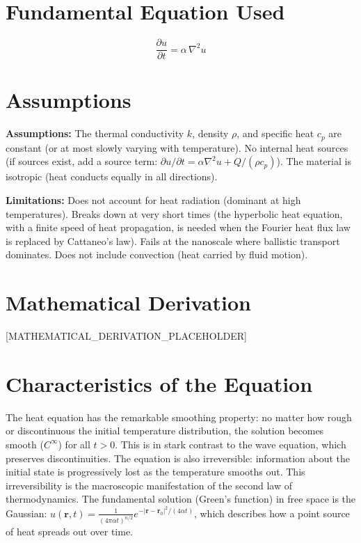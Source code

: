 \documentclass[11pt,openright]{book}
\begin{document}
\section*{Fundamental Equation Used}

\[
\frac{\partial u}{\partial t}=\alpha\,\nabla^2 u
\]
\section*{Assumptions}

\textbf{Assumptions:} The thermal conductivity $k$, density $\rho$, and specific heat $c_p$ are constant (or at most slowly varying with temperature). No internal heat sources (if sources exist, add a source term: $\partial u/\partial t = \alpha\nabla^2 u + Q/(\rho c_p)$). The material is isotropic (heat conducts equally in all directions).


\textbf{Limitations:} Does not account for heat radiation (dominant at high temperatures). Breaks down at very short times (the hyperbolic heat equation, with a finite speed of heat propagation, is needed when the Fourier heat flux law is replaced by Cattaneo's law). Fails at the nanoscale where ballistic transport dominates. Does not include convection (heat carried by fluid motion).


\section*{Mathematical Derivation}

[MATHEMATICAL_DERIVATION_PLACEHOLDER]

\section*{Characteristics of the Equation}

The heat equation has the remarkable smoothing property: no matter how rough or discontinuous the initial temperature distribution, the solution becomes smooth ($C^\infty$) for all $t > 0$. This is in stark contrast to the wave equation, which preserves discontinuities. The equation is also irreversible: information about the initial state is progressively lost as the temperature smooths out. This irreversibility is the macroscopic manifestation of the second law of thermodynamics. The fundamental solution (Green's function) in free space is the Gaussian: $u(\mathbf{r}, t) = \frac{1}{(4\pi\alpha t)^{n/2}}e^{-|\mathbf{r}-\mathbf{r}_0|^2/(4\alpha t)}$, which describes how a point source of heat spreads out over time.
\end{document}
